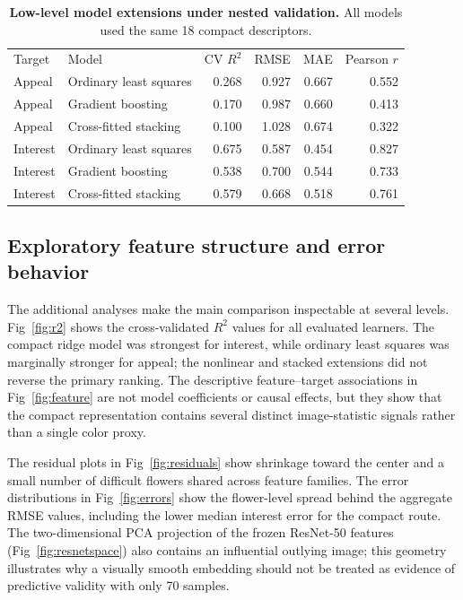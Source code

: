 \documentclass[10pt,letterpaper]{article}
\newlength\savedwidth
\newcommand\thickhline{\noalign{\global\savedwidth\arrayrulewidth\global\arrayrulewidth 2pt}\hline\noalign{\global\arrayrulewidth\savedwidth}}
\begin{document}
\begin{table}[!ht]
\centering
\caption{\textbf{Low-level model extensions under nested validation.} All models used the same 18 compact descriptors.}
\begin{tabular}{l l r r r r}
\hline
Target & Model & CV $R^2$ & RMSE & MAE & Pearson $r$\\ \thickhline
Appeal & Ordinary least squares & 0.268 & 0.927 & 0.667 & 0.552\\
Appeal & Gradient boosting & 0.170 & 0.987 & 0.660 & 0.413\\
Appeal & Cross-fitted stacking & 0.100 & 1.028 & 0.674 & 0.322\\
Interest & Ordinary least squares & 0.675 & 0.587 & 0.454 & 0.827\\
Interest & Gradient boosting & 0.538 & 0.700 & 0.544 & 0.733\\
Interest & Cross-fitted stacking & 0.579 & 0.668 & 0.518 & 0.761\\ \hline
\end{tabular}
\label{table_models}
\end{table}

\subsection*{Exploratory feature structure and error behavior}
The additional analyses make the main comparison inspectable at several levels. Fig~\ref{fig:r2} shows the cross-validated $R^2$ values for all evaluated learners. The compact ridge model was strongest for interest, while ordinary least squares was marginally stronger for appeal; the nonlinear and stacked extensions did not reverse the primary ranking. The descriptive feature--target associations in Fig~\ref{fig:feature} are not model coefficients or causal effects, but they show that the compact representation contains several distinct image-statistic signals rather than a single color proxy.

The residual plots in Fig~\ref{fig:residuals} show shrinkage toward the center and a small number of difficult flowers shared across feature families. The error distributions in Fig~\ref{fig:errors} show the flower-level spread behind the aggregate RMSE values, including the lower median interest error for the compact route. The two-dimensional PCA projection of the frozen ResNet-50 features (Fig~\ref{fig:resnetspace}) also contains an influential outlying image; this geometry illustrates why a visually smooth embedding should not be treated as evidence of predictive validity with only 70 samples.
\end{document}
